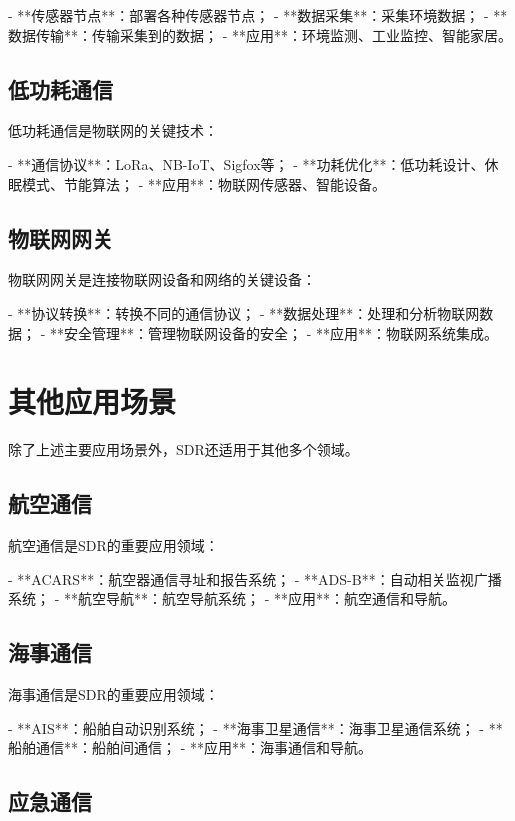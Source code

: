 ﻿\documentclass[UTF8]{ctexbook}
\begin{document}
- **传感器节点**：部署各种传感器节点；
- **数据采集**：采集环境数据；
- **数据传输**：传输采集到的数据；
- **应用**：环境监测、工业监控、智能家居。

\subsection{低功耗通信}

低功耗通信是物联网的关键技术：

- **通信协议**：LoRa、NB-IoT、Sigfox等；
- **功耗优化**：低功耗设计、休眠模式、节能算法；
- **应用**：物联网传感器、智能设备。

\subsection{物联网网关}

物联网网关是连接物联网设备和网络的关键设备：

- **协议转换**：转换不同的通信协议；
- **数据处理**：处理和分析物联网数据；
- **安全管理**：管理物联网设备的安全；
- **应用**：物联网系统集成。

\section{其他应用场景}

除了上述主要应用场景外，SDR还适用于其他多个领域。

\subsection{航空通信}

航空通信是SDR的重要应用领域：

- **ACARS**：航空器通信寻址和报告系统；
- **ADS-B**：自动相关监视广播系统；
- **航空导航**：航空导航系统；
- **应用**：航空通信和导航。

\subsection{海事通信}

海事通信是SDR的重要应用领域：

- **AIS**：船舶自动识别系统；
- **海事卫星通信**：海事卫星通信系统；
- **船舶通信**：船舶间通信；
- **应用**：海事通信和导航。

\subsection{应急通信}
\end{document}
